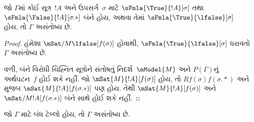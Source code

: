 \begin{prop}
  જો $\Gamma$માં કોઈ સૂત્ર~$!A$ અને
  ઉપસર્ગ~$\sigma$ માટે
  $\sFmla{\True}{!A}[\sigma]$ તથા
  $\sFmla{\False}{!A}[\sigma.{*}]$ બંને હોય,
  અથવા તેમાં $\sFmla{\True}{\lfalse}[\sigma]$
  હોય, તો $\Gamma$ અસંતોષ્ય છે.
\end{prop}

\begin{proof}
  હંમેશા $\mSat/{M}{\lfalse}[f(\sigma)]$ હોવાથી,
  $\sFmla{\True}{\lfalse}[\sigma]$ ધરાવતો
  $\Gamma$ અસંતોષ્ય છે.

  વળી, બંને વિરોધી ચિહ્નિત સૂત્રોને સંતોષતું
  નિદર્શ~$\mModel{M}$ અને $P(\Gamma)$નું અર્થઘટન~$f$
  હોઈ શકે નહીં. જો $\mSat{M}{!A}[f(\sigma)]$
  હોય, તો $Rf(\sigma)f(\sigma.{*})$ અને
   મુજબ
  $\mSat{M}{!A}[f(\sigma.{*})]$ પણ હોય.
  તેથી $\mSat{M}{!A}[f(\sigma)]$ અને
  $\mSat/{M}{!A}[f(\sigma.{*})]$ બંને સાથે
  હોઈ શકે નહીં.
\end{proof}

\begin{thm}[યથાર્થતા]
  જો $\Gamma$ માટે બંધ ટેબ્લો હોય,
  તો $\Gamma$ અસંતોષ્ય છે.
\end{thm}

